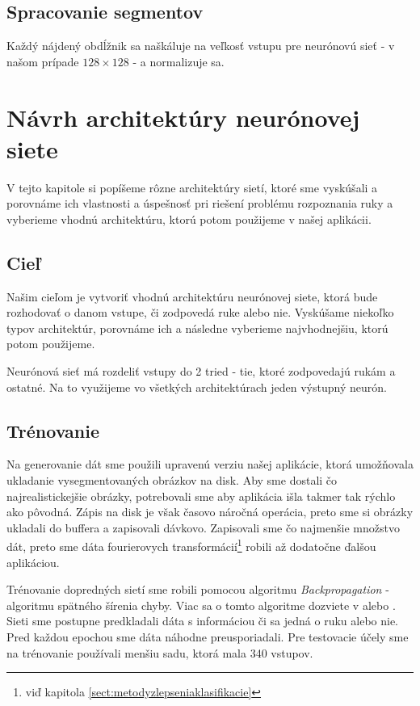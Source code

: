 \subsection{Spracovanie segmentov}
Každý nájdený obdĺžnik sa naškáluje na veľkosť vstupu pre neurónovú sieť - v našom prípade $128\times 128$ - a normalizuje sa.


\section{Návrh architektúry neurónovej siete}\label{chap:neuralnetarch}


V tejto kapitole si popíšeme rôzne architektúry sietí, ktoré sme vyskúšali a porovnáme ich vlastnosti a úspešnosť pri riešení problému rozpoznania ruky a vyberieme vhodnú architektúru, ktorú potom použijeme v našej aplikácii.

\subsection{Cieľ}

Našim cieľom je vytvoriť vhodnú architektúru neurónovej siete, ktorá bude rozhodovať o danom vstupe, či zodpovedá ruke alebo nie. Vyskúšame niekoľko typov architektúr, porovnáme ich a následne vyberieme najvhodnejšiu, ktorú potom použijeme. 

Neurónová sieť má rozdeliť vstupy do 2 tried - tie, ktoré zodpovedajú rukám a ostatné. Na to využijeme vo všetkých architektúrach jeden výstupný neurón.

\subsection{Trénovanie}

Na generovanie dát sme použili upravenú verziu našej aplikácie, ktorá umožňovala ukladanie vysegmentovaných obrázkov na disk. Aby sme dostali čo najrealistickejšie obrázky, potrebovali sme aby aplikácia išla takmer tak rýchlo ako pôvodná. Zápis na disk je však časovo náročná operácia, preto sme si obrázky ukladali do buffera a zapisovali dávkovo. Zapisovali sme čo najmenšie množstvo dát, preto sme dáta fourierovych transformácií\footnote{viď kapitola \ref{sect:metodyzlepseniaklasifikacie} } robili až dodatočne ďalšou aplikáciou.

Trénovanie dopredných sietí sme robili pomocou algoritmu \textit{Backpropagation} - algoritmu spätného šírenia chyby. Viac sa o tomto algoritme dozviete v \cite{haykin1999neural} alebo \cite{kvasnicka1997uvod}. Sieti sme postupne predkladali dáta s informáciou či sa jedná o ruku alebo nie. Pred každou epochou sme dáta náhodne preusporiadali. Pre testovacie účely sme na trénovanie používali menšiu sadu, ktorá mala 340 vstupov.

